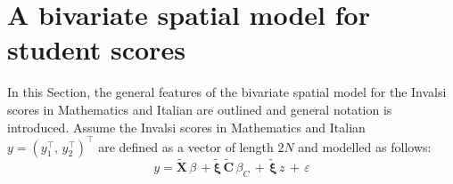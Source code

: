 \documentclass{book}
\begin{document}




\section{A bivariate spatial model for student scores}\label{section:Model_outline}

In this Section, the general features of the bivariate spatial model for the Invalsi scores in Mathematics and Italian are outlined and general notation is introduced.
Assume the Invalsi scores in Mathematics and Italian $y = (y_1^{\top}, \, y_2^{\top})^{\top}$ are defined as a vector of length $2N$ and modelled as follows:\\
\begin{equation}
y =  \mathbf{\tilde{X}}  \, \beta \,  + 
\tilde{\mathbf{\xi}} \, \mathbf{\tilde{C}} \, \beta_C \,  +
\, \tilde{\mathbf{\xi}} \,z \, + \, \varepsilon
\label{eq:model}
\end{equation}
\\
\end{document}
